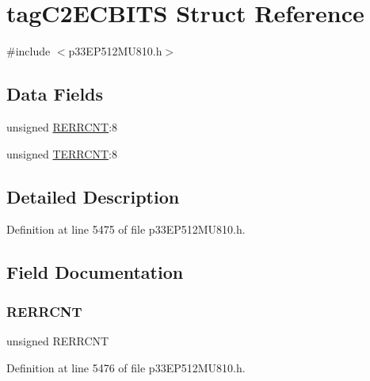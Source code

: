 \hypertarget{structtag_c2_e_c_b_i_t_s}{}\section{tag\+C2\+E\+C\+B\+I\+TS Struct Reference}
\label{structtag_c2_e_c_b_i_t_s}


{\ttfamily \#include $<$p33\+E\+P512\+M\+U810.\+h$>$}

\subsection*{Data Fields}
\begin{DoxyCompactItemize}
\item 
unsigned \hyperlink{structtag_c2_e_c_b_i_t_s_ad9ea27afc90da98d70dcad32d97c2071}{R\+E\+R\+R\+C\+NT}\+:8
\item 
unsigned \hyperlink{structtag_c2_e_c_b_i_t_s_a1581e101a719f30685a8534da9f84b32}{T\+E\+R\+R\+C\+NT}\+:8
\end{DoxyCompactItemize}


\subsection{Detailed Description}


Definition at line 5475 of file p33\+E\+P512\+M\+U810.\+h.



\subsection{Field Documentation}
\mbox{\label{structtag_c2_e_c_b_i_t_s_ad9ea27afc90da98d70dcad32d97c2071}} 
\subsubsection{\texorpdfstring{R\+E\+R\+R\+C\+NT}{RERRCNT}}
{\footnotesize\ttfamily unsigned R\+E\+R\+R\+C\+NT}



Definition at line 5476 of file p33\+E\+P512\+M\+U810.\+h.

\mbox{\label{structtag_c2_e_c_b_i_t_s_a1581e101a719f30685a8534da9f84b32}} 
